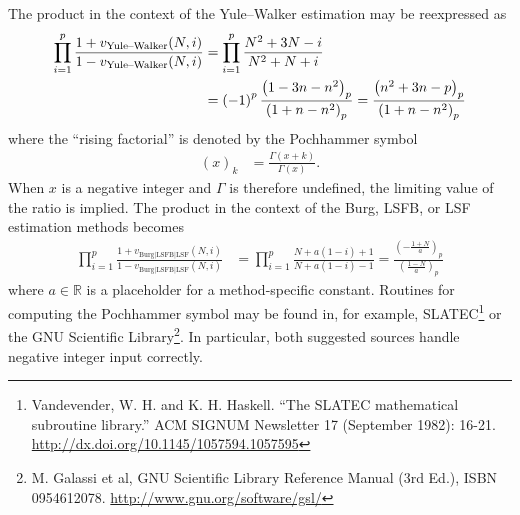 \documentclass[12pt,letterpaper]{article}
\newcommand{\Pochhammer}[2]{\left(#1\right)_{#2}}
\begin{document}
The product in the context of the Yule--Walker estimation may be reexpressed as
\begin{align}
    \prod_{i=1}^{p}
    \frac{
        1 + v_\text{Yule--Walker}\!\left(N,i\right)
    }{
        1 - v_\text{Yule--Walker}\!\left(N,i\right)
    }
    &=
    \prod_{i=1}^{p}
    \frac{
        N^2 + 3N - i
    }{
        N^2 +  N + i
    }
    \notag
    \\
    &=
    \left(-1\right)^p
    \frac{
        \Pochhammer{1-3n-n^2}{p}
    }{
        \Pochhammer{1+ n-n^2}{p}
    }
    =
    \frac{
        \Pochhammer{n^2+3n-p}{p}
    }{
        \Pochhammer{1+n-n^2}{p}
    }
    \label{eq:pochYW}
\end{align}
where the ``rising factorial'' is denoted by the Pochhammer symbol
\begin{align}
    \Pochhammer{x}{k} &= \frac{\Gamma\left(x+k\right)}{\Gamma\left(x\right)}
    .
\end{align}
When $x$ is a negative integer and $\Gamma$ is therefore undefined, the
limiting value of the ratio is implied.  The product in the context of the
Burg, LSFB, or LSF estimation methods becomes
\begin{align}
    \prod_{i=1}^{p}
    \frac{
        1 + v_\text{Burg$\vert{}$LSFB$\vert{}$LSF}\!\left(N,i\right)
    }{
        1 - v_\text{Burg$\vert{}$LSFB$\vert{}$LSF}\!\left(N,i\right)
    }
    &=
    \prod_{i=1}^{p}
    \frac{
        N + a\left(1-i\right) + 1
    }{
        N + a\left(1-i\right) - 1
    }
    =
    \frac{
        \Pochhammer{-\frac{1+N}{a}}{p}
    }{
        \Pochhammer{\frac{1-N}{a}}{p}
    }
    \label{eq:pochCommon}
\end{align}
where $a\in\mathbb{R}$ is a placeholder for a method-specific constant.
Routines for computing the Pochhammer symbol may be found in, for example,
SLATEC\footnote{ Vandevender, W. H. and K. H. Haskell. ``The SLATEC
mathematical subroutine library.'' ACM SIGNUM Newsletter 17 (September 1982):
16-21.  \url{http://dx.doi.org/10.1145/1057594.1057595} } or the GNU Scientific
Library\footnote{ M. Galassi et al, GNU Scientific Library Reference Manual
(3rd Ed.), ISBN 0954612078. \url{http://www.gnu.org/software/gsl/} }.  In
particular, both suggested sources handle negative integer input correctly.
\end{document}
